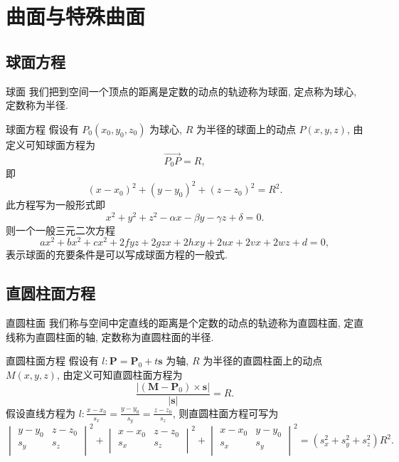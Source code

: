 \documentclass[cn,toc=twocol]{elegantbook}
\newcommand{\ve}[1]{\boldsymbol{#1}}
\newcommand{\Ve}[1]{\overrightarrow{#1}}
\newcommand{\ds}{\displaystyle}
\begin{document}
\section{曲面与特殊曲面}

\subsection{球面方程}

\begin{definition}{球面}
我们把到空间一个顶点的距离是定数的动点的轨迹称为球面, 定点称为球心, 定数称为半径.
\end{definition}

\begin{proposition}{球面方程}
	假设有 $P_0 (x_0,y_0,z_0)$ 为球心, $R$ 为半径的球面上的动点 $P (x,y,z)$, 由定义可知球面方程为
	\[
		\Ve{P_0 P} = R,
	\]
	即
	\[
		(x - x_0)^2 + (y - y_0)^2 + (z - z_0)^2 = R^2.
	\]
	此方程写为一般形式即
	\[
		x^2 + y^2 + z^2 - \alpha x - \beta y - \gamma z + \delta = 0. 
	\]
	则一个一般三元二次方程
	\[
		ax^2 + bx^2 + cx^2 + 2fyz + 2gzx + 2hxy + 2ux + 2vx + 2wz + d = 0,
	\]
	表示球面的充要条件是可以写成球面方程的一般式.
\end{proposition}


\subsection{直圆柱面方程}

\begin{definition}{直圆柱面}
	我们称与空间中定直线的距离是个定数的动点的轨迹称为直圆柱面, 定直线称为直圆柱面的轴, 定数称为直圆柱面的半径.
\end{definition}

\begin{proposition}{直圆柱面方程}
	假设有 $l: \ve P = \ve P_0 + t \ve s$ 为轴, $R$ 为半径的直圆柱面上的动点 $M (x,y,z)$, 由定义可知直圆柱面方程为
	\[
		\frac{\lvert (\ve M - \ve P_0) \times \ve s \rvert}{\lvert \ve s \rvert} = R.
	\]
	假设直线方程为 $\ds l: \frac{x - x_0}{s_x} = \frac{y - y_0}{s_y} = \frac{z - z_0}{s_z}$, 则直圆柱面方程可写为
	\[
		\begin{vmatrix}
			y - y_0 & z - z_0\\
			s_y & s_z\\ 
		\end{vmatrix}^2 + \begin{vmatrix}
			x - x_0 & z - z_0\\
			s_x & s_z\\ 
		\end{vmatrix}^2 + \begin{vmatrix}
			x - x_0 & y - y_0\\
			s_x & s_y\\ 
		\end{vmatrix}^2 = (s_x^2 + s_y^2 + s_z^2) R^2.
	\]
\end{proposition}
\end{document}
